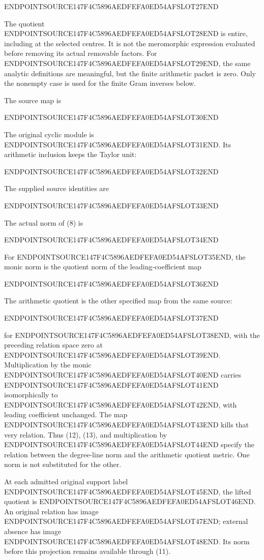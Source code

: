 ENDPOINTSOURCE147F4C5896AEDFEFA0ED54AFSLOT27END

The quotient ENDPOINTSOURCE147F4C5896AEDFEFA0ED54AFSLOT28END is entire, including at the selected centres. It is not the meromorphic expression evaluated before removing its actual removable factors. For ENDPOINTSOURCE147F4C5896AEDFEFA0ED54AFSLOT29END, the same analytic definitions are meaningful, but the finite arithmetic packet is zero. Only the nonempty case is used for the finite Gram inverses below.

The source map is

ENDPOINTSOURCE147F4C5896AEDFEFA0ED54AFSLOT30END

The original cyclic module is ENDPOINTSOURCE147F4C5896AEDFEFA0ED54AFSLOT31END. Its arithmetic inclusion keeps the Taylor unit:

ENDPOINTSOURCE147F4C5896AEDFEFA0ED54AFSLOT32END

The supplied source identities are

ENDPOINTSOURCE147F4C5896AEDFEFA0ED54AFSLOT33END

The actual norm of (8) is

ENDPOINTSOURCE147F4C5896AEDFEFA0ED54AFSLOT34END

For ENDPOINTSOURCE147F4C5896AEDFEFA0ED54AFSLOT35END, the monic norm is the quotient norm of the leading-coefficient map

ENDPOINTSOURCE147F4C5896AEDFEFA0ED54AFSLOT36END

The arithmetic quotient is the other specified map from the same source:

ENDPOINTSOURCE147F4C5896AEDFEFA0ED54AFSLOT37END

for ENDPOINTSOURCE147F4C5896AEDFEFA0ED54AFSLOT38END, with the preceding relation space zero at ENDPOINTSOURCE147F4C5896AEDFEFA0ED54AFSLOT39END. Multiplication by the monic ENDPOINTSOURCE147F4C5896AEDFEFA0ED54AFSLOT40END carries ENDPOINTSOURCE147F4C5896AEDFEFA0ED54AFSLOT41END isomorphically to ENDPOINTSOURCE147F4C5896AEDFEFA0ED54AFSLOT42END, with leading coefficient unchanged. The map ENDPOINTSOURCE147F4C5896AEDFEFA0ED54AFSLOT43END kills that very relation. Thus (12), (13), and multiplication by ENDPOINTSOURCE147F4C5896AEDFEFA0ED54AFSLOT44END specify the relation between the degree-line norm and the arithmetic quotient metric. One norm is not substituted for the other.

At each admitted original support label ENDPOINTSOURCE147F4C5896AEDFEFA0ED54AFSLOT45END, the lifted quotient is ENDPOINTSOURCE147F4C5896AEDFEFA0ED54AFSLOT46END. An original relation has image ENDPOINTSOURCE147F4C5896AEDFEFA0ED54AFSLOT47END; external absence has image ENDPOINTSOURCE147F4C5896AEDFEFA0ED54AFSLOT48END. Its norm before this projection remains available through (11).

